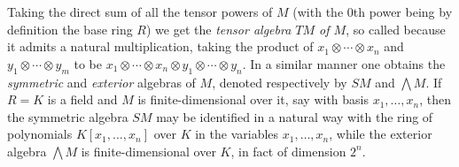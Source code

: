 Taking the direct sum of all the tensor powers of $M$ (with the $0$th power being by definition the base ring $R$) we get the {\sl tensor algebra $TM$ of $M$}, so called because it admits a natural multiplication, taking the product of $x_1\otimes\cdots\otimes x_n$ and $y_1\otimes\cdots\otimes
y_m$ to be $x_1\otimes\cdots\otimes x_n\otimes y_1\otimes\cdots\otimes y_n$.  In a similar manner one obtains the {\sl symmetric} and {\sl exterior} algebras of $M$, denoted respectively by $SM$ and $\bigwedge M$.  If $R=K$ is a field and $M$ is finite-dimensional over it, say with basis $x_1,\ldots,x_n$, then the symmetric algebra $SM$ may be identified in a natural way with the ring of polynomials $K[x_1,\ldots,x_n]$ over $K$ in the variables $x_1,\ldots,x_n$, while the exterior algebra $\bigwedge M$ is finite-dimensional over $K$, in fact of dimension $2^n$.